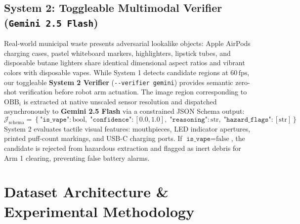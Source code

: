 \documentclass[10pt,a4paper]{article}
\begin{document}
\subsection{System 2: Toggleable Multimodal Verifier (\texttt{Gemini 2.5 Flash})}
Real-world municipal waste presents adversarial lookalike objects: Apple AirPods charging cases, pastel whiteboard markers, highlighters, lipstick tubes, and disposable butane lighters share identical dimensional aspect ratios and vibrant colors with disposable vapes.
While System 1 detects candidate regions at $60\,\text{fps}$, our toggleable \textbf{System 2 Verifier} (\texttt{-{}-verifier gemini}) provides semantic zero-shot verification before robot arm actuation. The image region corresponding to $\text{OBB}_i$ is extracted at native unscaled sensor resolution and dispatched asynchronously to \textbf{Gemini 2.5 Flash} via a constrained JSON Schema output:
\begin{equation}
    \mathcal{J}_{\text{schema}} = \left\{ \texttt{"is\_vape"}: \text{bool}, \; \texttt{"confidence"}: [0.0, 1.0], \; \texttt{"reasoning"}: \text{str}, \; \texttt{"hazard\_flags"}: [\text{str}] \right\}
\end{equation}
System 2 evaluates tactile visual features: mouthpieces, LED indicator apertures, printed puff-count markings, and USB-C charging ports. If $\texttt{is\_vape} = \text{false}$, the candidate is rejected from hazardous extraction and flagged as inert debris for Arm 1 clearing, preventing false battery alarms.

\section{Dataset Architecture \& Experimental Methodology}
\end{document}
